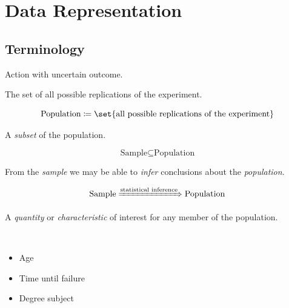 \section{Data Representation}

\subsection{Terminology}

\begin{definition}
    Action with uncertain outcome.
\end{definition}

\begin{definition}[Population]
    The set of all possible replications of the experiment.
    
    \begin{equation*}
        \text{Population} \coloneqq \set{ \text{all possible replications of the experiment} }
    \end{equation*}
\end{definition}

\begin{definition}[Sample]
    A \textit{subset} of the population.
    
    \begin{equation*}
        \text{Sample} \subseteq \text{Population}
    \end{equation*}
\end{definition}

\begin{definition}
    From the \textit{sample} we may be able to \textit{infer} conclusions about the \textit{population}.
    
    \begin{equation*}
        \text{Sample} \xRightarrow{\text{statistical inference}} \text{Population}
    \end{equation*}
\end{definition}

\begin{definition}[Variable]
    A \textit{quantity} or \textit{characteristic} of interest for any member of the population.
\end{definition}

\begin{example}\
    \begin{itemize}
        \item Age
        \item Time until failure
        \item Degree subject
    \end{itemize}
\end{example}

